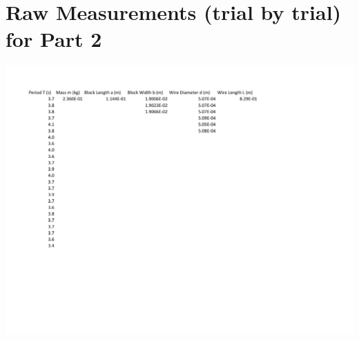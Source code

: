 \documentclass[leqno]{article}
\begin{document}
\section*{Raw Measurements (trial by trial) for Part 2}
\includegraphics[width=\linewidth]{lab1datab}
\newpage
\end{document}
